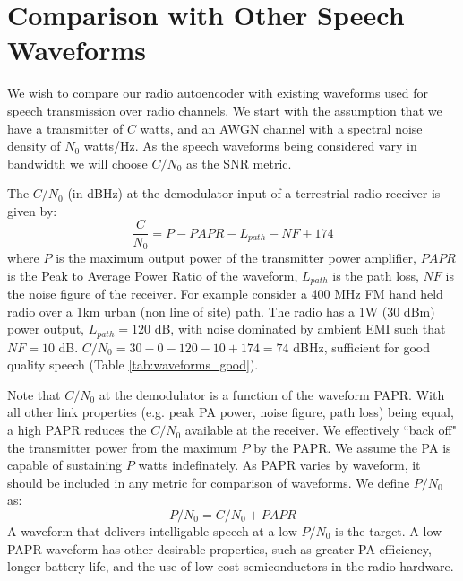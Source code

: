 \documentclass{article}
\begin{document}
\section{Comparison with Other Speech Waveforms}

We wish to compare our radio autoencoder with existing waveforms used for speech transmission over radio channels.  We start with the assumption that we have a transmitter of $C$ watts, and an AWGN channel with a spectral noise density of $N_0$ watts/Hz. As the speech waveforms being considered vary in bandwidth we will choose $C/N_0$ as the SNR metric.

The $C/N_0$ (in dBHz) at the demodulator input of a terrestrial radio receiver is given by:
\begin{equation}
\frac{C}{N_0} = P - PAPR - L_{path} - NF + 174
\end{equation}
where $P$ is the maximum output power of the transmitter power amplifier, $PAPR$ is the Peak to Average Power Ratio of the waveform, $L_{path}$ is the path loss, $NF$ is the noise figure of the receiver.  For example consider a 400 MHz FM hand held radio over a 1km urban (non line of site) path.  The radio has a 1W (30 dBm) power output, $L_{path}=120$ dB, with noise dominated by ambient EMI such that $NF=10$ dB. $C/N_0 = 30 - 0 - 120 - 10 + 174 = 74$ dBHz, sufficient for good quality speech (Table \ref{tab:waveforms_good}).

Note that $C/N_0$ at the demodulator is a function of the waveform PAPR.  With all other link properties (e.g. peak PA power, noise figure, path loss) being equal, a high PAPR reduces the $C/N_0$ available at the receiver.  We effectively ``back off" the transmitter power from the maximum $P$ by the PAPR.  We assume the PA is capable of sustaining $P$ watts indefinately. As PAPR varies by waveform, it should be included in any metric for comparison of waveforms.  We define $P/N_0$ as:
\begin{equation}
P/N_0 = C/N_0 + PAPR
\end{equation} 
A waveform that delivers intelligable speech at a low $P/N_0$ is the target.  A low PAPR waveform has other desirable properties, such as greater PA efficiency, longer battery life, and the use of low cost semiconductors in the radio hardware.
\end{document}
